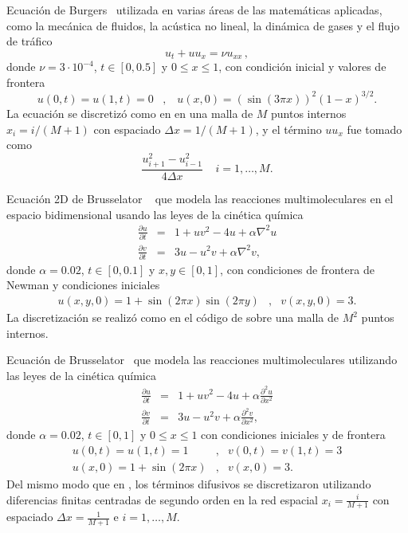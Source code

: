 \begin{example}\label{ex:Burgers}
     Ecuación de Burgers~\cite{tokman2006efficient} utilizada en varias áreas de las matemáticas aplicadas, como la mecánica de fluidos, la acústica no lineal, la dinámica de gases y el flujo de tráfico
    \[ u_t+uu_x=\nu u_{xx}\,, \]
    donde $\nu = 3\cdot10^{-4}$, $t\in [0,0\mathord{.}5]$ y $0\leq x\leq 1$, con condición inicial y valores de frontera
    \begin{equation*}
    u(0,t)=u(1,t)=0 \;\;\; ,   \;\;\;  u(x,0)=(\sin(3\pi x))^{2}(1-x)^{3/2}.
    \end{equation*}
    La ecuación se discretizó como en \cite{tokman2006efficient} en una malla de $M$ puntos internos $x_i = i/(M+1)$ con espaciado $\Delta x=1/(M+1)$, y el término $uu_x$ fue tomado como
    \[ \frac{u_{i+1}^{2}-u_{i-1}^{2}}{4\Delta x} \;\;\;\;  i=1,\ldots,M.\]
\end{example}

\begin{example}\label{ex:Brus2D}
    Ecuación 2D de Brusselator ~\cite{lefever1971chemical,tokman2012new} que modela las reacciones multimoleculares en el espacio bidimensional usando las leyes de la cinética química
    \begin{eqnarray*}
        \frac{\partial u}{\partial t} &=&1+uv^{2}-4u+\alpha \nabla^{2}u\\
        \frac{\partial v}{\partial t}&=&3u-u^{2}v+\alpha \nabla^{2}v,
    \end{eqnarray*}
    donde $\alpha = 0\mathord{.}02$, $t\in[0, 0\mathord{.}1]$ y $x,y\in[0,1]$,
    con condiciones de frontera de Newman y condiciones iniciales
    \begin{eqnarray*}
        u(x,y,0)=1+\sin(2\pi x)\sin(2\pi y) &,& v(x,y,0)=3.
    \end{eqnarray*}
    La discretización se realizó como en el código de \cite{jansing2011expode} sobre una malla de $M^2$ puntos internos.
\end{example}

\begin{example}\label{ex:Brus}
    Ecuación de Brusselator~\cite{lefever1971chemical,tokman2006efficient} que modela las reacciones multimoleculares utilizando las leyes de la cinética química
    \begin{eqnarray*}
        \frac{\partial u}{\partial t}&=&1+uv^{2}-4u+\alpha \frac{\partial ^{2}u}{\partial x^{2}}\\
        \frac{\partial v}{\partial t}&=&3u-u^{2}v+\alpha \frac{\partial ^{2}v}{\partial x^{2}},
    \end{eqnarray*}
    donde $\alpha = 0\mathord{.}02$, $t\in [0,1]$ y $0\leq x \leq 1$ con condiciones iniciales y de frontera
    \begin{eqnarray*}
        u(0,t)=u(1,t)=1 &,& v(0,t)=v(1,t)=3\\
        u(x,0)=1+\sin(2\pi x) &,& v(x,0)=3 .
    \end{eqnarray*}
    Del mismo modo que en \cite{tokman2006efficient}, los términos difusivos se discretizaron utilizando diferencias finitas centradas de segundo orden en la red espacial $x_i=\frac{i}{M+1}$ con espaciado  $\Delta x = \frac{1}{M+1}$ e $i=1,\ldots,M$.
\end{example}

